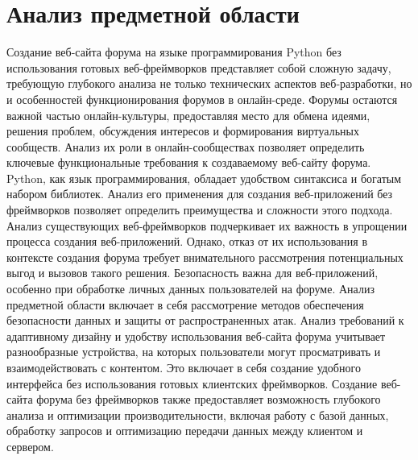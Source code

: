 \section{Анализ предметной области}

Создание веб-сайта форума на языке программирования Python без использования готовых веб-фреймворков представляет собой сложную задачу, требующую глубокого анализа не только технических аспектов веб-разработки, но и особенностей функционирования форумов в онлайн-среде. Форумы остаются важной частью онлайн-культуры, предоставляя место для обмена идеями, решения проблем, обсуждения интересов и формирования виртуальных сообществ. Анализ их роли в онлайн-сообществах позволяет определить ключевые функциональные требования к создаваемому веб-сайту форума. Python, как язык программирования, обладает удобством синтаксиса и богатым набором библиотек. Анализ его применения для создания веб-приложений без фреймворков позволяет определить преимущества и сложности этого подхода. Анализ существующих веб-фреймворков подчеркивает их важность в упрощении процесса создания веб-приложений. Однако, отказ от их использования в контексте создания форума требует внимательного рассмотрения потенциальных выгод и вызовов такого решения. Безопасность важна для веб-приложений, особенно при обработке личных данных пользователей на форуме. Анализ предметной области включает в себя рассмотрение методов обеспечения безопасности данных и защиты от распространенных атак. Анализ требований к адаптивному дизайну и удобству использования веб-сайта форума учитывает разнообразные устройства, на которых пользователи могут просматривать и взаимодействовать с контентом. Это включает в себя создание удобного интерфейса без использования готовых клиентских фреймворков. Создание веб-сайта форума без фреймворков также предоставляет возможность глубокого анализа и оптимизации производительности, включая работу с базой данных, обработку запросов и оптимизацию передачи данных между клиентом и сервером.
